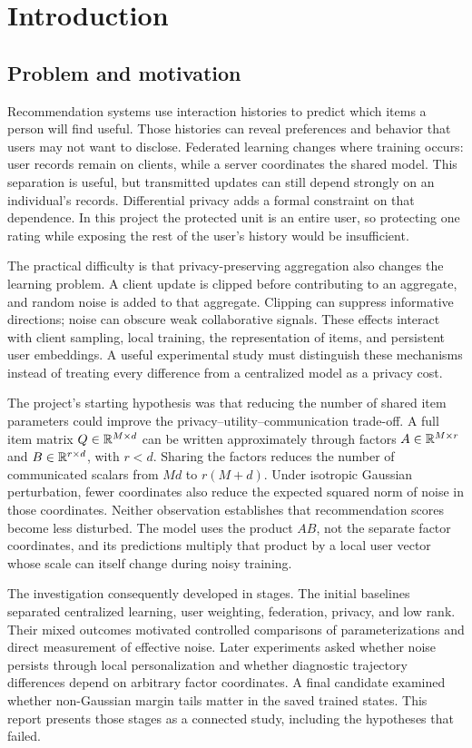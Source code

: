 \section{Introduction}
\label{sec:introduction}
\subsection{Problem and motivation}
Recommendation systems use interaction histories to predict which items a person
will find useful. Those histories can reveal preferences and behavior that users
may not want to disclose. Federated learning changes where training occurs: user
records remain on clients, while a server coordinates the shared model. This
separation is useful, but transmitted updates can still depend strongly on an
individual's records. Differential privacy adds a formal constraint on that
dependence. In this project the protected unit is an entire user, so protecting
one rating while exposing the rest of the user's history would be insufficient.

The practical difficulty is that privacy-preserving aggregation also changes the
learning problem. A client update is clipped before contributing to an aggregate,
and random noise is added to that aggregate. Clipping can suppress informative
directions; noise can obscure weak collaborative signals. These effects interact
with client sampling, local training, the representation of items, and persistent
user embeddings. A useful experimental study must distinguish these mechanisms
instead of treating every difference from a centralized model as a privacy cost.

The project's starting hypothesis was that reducing the number of shared item
parameters could improve the privacy--utility--communication trade-off. A full
item matrix $Q\in\mathbb{R}^{M\times d}$ can be written approximately through factors
$A\in\mathbb{R}^{M\times r}$ and $B\in\mathbb{R}^{r\times d}$, with $r<d$. Sharing the factors
reduces the number of communicated scalars from $Md$ to $r(M+d)$. Under isotropic
Gaussian perturbation, fewer coordinates also reduce the expected squared norm
of noise in those coordinates. Neither observation establishes that recommendation
scores become less disturbed. The model uses the product $AB$, not the separate
factor coordinates, and its predictions multiply that product by a local user
vector whose scale can itself change during noisy training.

The investigation consequently developed in stages. The initial baselines
separated centralized learning, user weighting, federation, privacy, and low rank.
Their mixed outcomes motivated controlled comparisons of parameterizations and
direct measurement of effective noise. Later experiments asked whether noise
persists through local personalization and whether diagnostic trajectory
differences depend on arbitrary factor coordinates. A final candidate examined
whether non-Gaussian margin tails matter in the saved trained states. This report
presents those stages as a connected study, including the hypotheses that failed.

